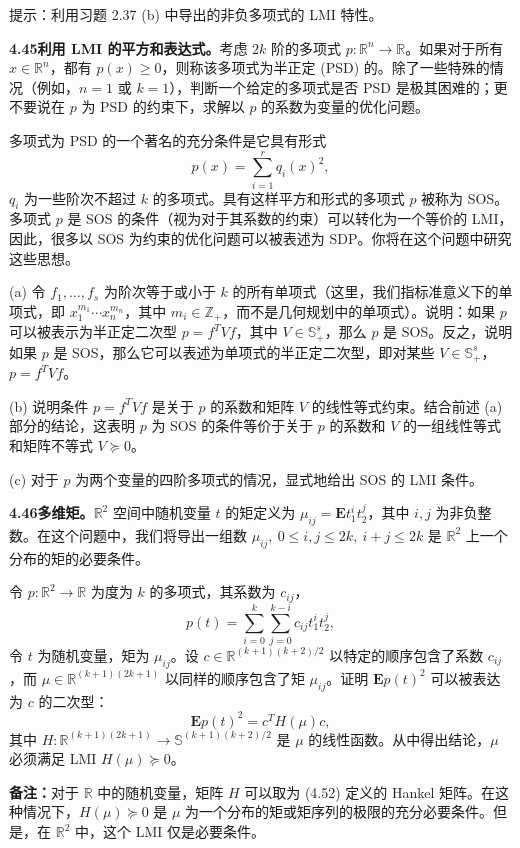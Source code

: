 \documentclass[UTF8, 12pt, fontset=fandol, oneside]{ctexart}
\begin{document}
提示：利用习题 2.37 (b) 中导出的非负多项式的 LMI 特性。

\noindent\textbf{4.45\quad 利用 LMI 的平方和表达式。}\quad 考虑 $2k$ 阶的多项式 $p:\mathbb{R}^n\to\mathbb{R}$。如果对于所有 $x\in\mathbb{R}^n$，都有 $p(x)\geq0$，则称该多项式为半正定 (PSD) 的。除了一些特殊的情况（例如，$n=1$ 或 $k=1$），判断一个给定的多项式是否 PSD 是极其困难的；更不要说在 $p$ 为 PSD 的约束下，求解以 $p$ 的系数为变量的优化问题。

多项式为 PSD 的一个著名的充分条件是它具有形式
\[
p(x)=\sum_{i=1}^r q_i(x)^2,
\]
$q_i$ 为一些阶次不超过 $k$ 的多项式。具有这样平方和形式的多项式 $p$ 被称为 SOS。多项式 $p$ 是 SOS 的条件（视为对于其系数的约束）可以转化为一个等价的 LMI，因此，很多以 SOS 为约束的优化问题可以被表述为 SDP。你将在这个问题中研究这些思想。

(a) 令 $f_1,\ldots,f_s$ 为阶次等于或小于 $k$ 的所有单项式（这里，我们指标准意义下的单项式，即 $x_1^{m_1}\cdots x_n^{m_n}$，其中 $m_i\in\mathbb{Z}_+$，而不是几何规划中的单项式）。说明：如果 $p$ 可以被表示为半正定二次型 $p=f^TVf$，其中 $V\in\mathbb{S}_+^s$，那么 $p$ 是 SOS。反之，说明如果 $p$ 是 SOS，那么它可以表述为单项式的半正定二次型，即对某些 $V\in\mathbb{S}_+^s$，$p=f^TVf$。

(b) 说明条件 $p=f^TVf$ 是关于 $p$ 的系数和矩阵 $V$ 的线性等式约束。结合前述 (a) 部分的结论，这表明 $p$ 为 SOS 的条件等价于关于 $p$ 的系数和 $V$ 的一组线性等式和矩阵不等式 $V\succeq0$。

(c) 对于 $p$ 为两个变量的四阶多项式的情况，显式地给出 SOS 的 LMI 条件。

\noindent\textbf{4.46\quad 多维矩。}\quad $\mathbb{R}^2$ 空间中随机变量 $t$ 的矩定义为 $\mu_{ij}=\mathbf{E}t_1^it_2^j$，其中 $i,j$ 为非负整数。在这个问题中，我们将导出一组数 $\mu_{ij},\ 0\leq i,j\leq 2k,\ i+j\leq2k$ 是 $\mathbb{R}^2$ 上一个分布的矩的必要条件。

令 $p:\mathbb{R}^2\to\mathbb{R}$ 为度为 $k$ 的多项式，其系数为 $c_{ij}$，
\[
p(t)=\sum_{i=0}^k\sum_{j=0}^{k-i}c_{ij}t_1^it_2^j,
\]
令 $t$ 为随机变量，矩为 $\mu_{ij}$。设 $c\in\mathbb{R}^{(k+1)(k+2)/2}$ 以特定的顺序包含了系数 $c_{ij}$，而 $\mu\in\mathbb{R}^{(k+1)(2k+1)}$ 以同样的顺序包含了矩 $\mu_{ij}$。证明 $\mathbf{E}p(t)^2$ 可以被表达为 $c$ 的二次型：
\[
\mathbf{E}p(t)^2=c^TH(\mu)c,
\]
其中 $H:\mathbb{R}^{(k+1)(2k+1)}\to\mathbb{S}^{(k+1)(k+2)/2}$ 是 $\mu$ 的线性函数。从中得出结论，$\mu$ 必须满足 LMI $H(\mu)\succeq0$。

\noindent\textbf{备注：}\quad 对于 $\mathbb{R}$ 中的随机变量，矩阵 $H$ 可以取为 (4.52) 定义的 Hankel 矩阵。在这种情况下，$H(\mu)\succeq0$ 是 $\mu$ 为一个分布的矩或矩序列的极限的充分必要条件。但是，在 $\mathbb{R}^2$ 中，这个 LMI 仅是必要条件。
\end{document}
